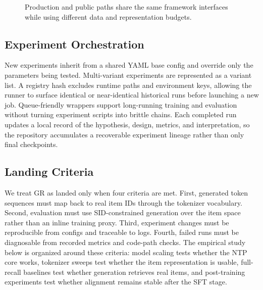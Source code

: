 \documentclass[11pt]{article}
\begin{document}
\begin{figure}[t]
\centering
{}
\caption{Production and public paths share the same framework interfaces while using different data and representation budgets.}
\label{fig:shared-interface}
\end{figure}

\subsection{Experiment Orchestration}

New experiments inherit from a shared YAML base config and override only the parameters being tested. Multi-variant experiments are represented as a variant list. A registry hash excludes runtime paths and environment keys, allowing the runner to surface identical or near-identical historical runs before launching a new job. Queue-friendly wrappers support long-running training and evaluation without turning experiment scripts into brittle chains. Each completed run updates a local record of the hypothesis, design, metrics, and interpretation, so the repository accumulates a recoverable experiment lineage rather than only final checkpoints.

\subsection{Landing Criteria}

We treat GR as landed only when four criteria are met. First, generated token sequences must map back to real item IDs through the tokenizer vocabulary. Second, evaluation must use SID-constrained generation over the item space rather than an inline training proxy. Third, experiment changes must be reproducible from configs and traceable to logs. Fourth, failed runs must be diagnosable from recorded metrics and code-path checks. The empirical study below is organized around these criteria: model scaling tests whether the NTP core works, tokenizer sweeps test whether the item representation is usable, full-recall baselines test whether generation retrieves real items, and post-training experiments test whether alignment remains stable after the SFT stage.
\end{document}

